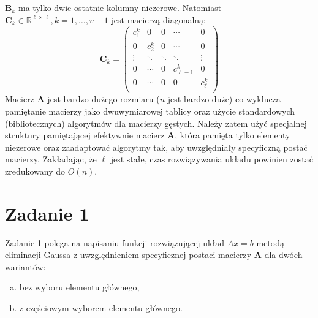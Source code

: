 \documentclass[12pt]{article}
\begin{document}
$\textbf{B}_k$ ma tylko dwie ostatnie kolumny niezerowe. Natomiast  $\textbf{C}_k \in \mathbb{R}^{\ell \times \ell}, k = 1, \dots, v-1$ jest macierzą diagonalną:
\begin{equation}
\textbf{C}_k = 
\begin{pmatrix}
c^k_1 & 0 & 0 & \cdots & 0 \\
0 & c^k_2 & 0 & \cdots & 0 \\
\vdots & \ddots & \ddots & \ddots & \vdots \\
0 & \cdots & 0 & c^k_{\ell - 1} & 0 \\
0 & \cdots & 0 & 0 & c^k_{\ell}\\
\end{pmatrix}
\end{equation}
Macierz $\textbf{A}$ jest bardzo dużego rozmiaru ($n$ jest bardzo duże) co wyklucza pamiętanie macierzy jako dwuwymiarowej tablicy oraz użycie standardowych (bibliotecznych) algorytmów dla macierzy gęstych. Należy zatem użyć specjalnej struktury pamiętającej efektywnie macierz $\textbf{A}$, która pamięta tylko elementy niezerowe oraz zaadaptować algorytmy tak, aby uwzględniały specyficzną postać macierzy. Zakładając, że $\ell$ jest stałe, czas rozwiązywania układu powinien zostać zredukowany do $O(n)$.


\section{Zadanie 1}
Zadanie 1 polega na napisaniu funkcji rozwiązującej układ $Ax = b$ metodą eliminacji Gaussa z uwzględnieniem specyficznej postaci macierzy $\textbf{A}$ dla dwóch wariantów:
\begin{enumerate}[(a)]
	\item bez wyboru elementu głównego,
	\item z częściowym wyborem elementu głównego.
\end{enumerate}
\end{document}
